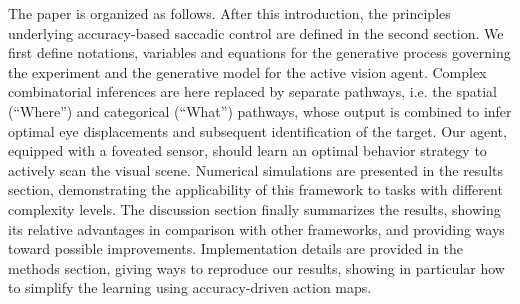 The paper is organized as follows.
After this introduction, the principles underlying accuracy-based saccadic control are defined in the second section. {\color{black} We first define notations, variables and equations for the generative process governing the experiment and the generative model for the active vision agent.}
Complex combinatorial inferences are here replaced by separate pathways, i.e. the spatial (``Where'') and categorical (``What'') pathways, whose output is combined to infer optimal eye displacements and subsequent identification of the target. Our agent, equipped with a foveated sensor, should learn an optimal behavior strategy to actively scan the visual scene. Numerical simulations are presented in the results section, demonstrating the applicability of this framework to tasks with different complexity levels. %
The discussion section finally summarizes the results, showing its relative advantages in comparison with other frameworks, and providing ways toward possible improvements.
Implementation details are provided in the methods section, giving ways to reproduce our results, showing in particular how to simplify the learning using accuracy-driven action maps.


